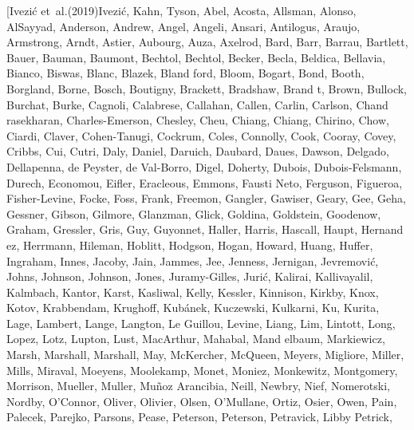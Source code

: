 \documentclass[twocolumn]{aastex62}
\begin{document}
\begin{thebibliography}{}
\bibitem[{{Ivezi{\'c}} {et~al.}(2019){Ivezi{\'c}}, {Kahn}, {Tyson}, {Abel},
  {Acosta}, {Allsman}, {Alonso}, {AlSayyad}, {Anderson}, {Andrew}, {Angel},
  {Angeli}, {Ansari}, {Antilogus}, {Araujo}, {Armstrong}, {Arndt}, {Astier},
  {Aubourg}, {Auza}, {Axelrod}, {Bard}, {Barr}, {Barrau}, {Bartlett}, {Bauer},
  {Bauman}, {Baumont}, {Bechtol}, {Bechtol}, {Becker}, {Becla}, {Beldica},
  {Bellavia}, {Bianco}, {Biswas}, {Blanc}, {Blazek}, {Bland ford}, {Bloom},
  {Bogart}, {Bond}, {Booth}, {Borgland}, {Borne}, {Bosch}, {Boutigny},
  {Brackett}, {Bradshaw}, {Brand t}, {Brown}, {Bullock}, {Burchat}, {Burke},
  {Cagnoli}, {Calabrese}, {Callahan}, {Callen}, {Carlin}, {Carlson}, {Chand
  rasekharan}, {Charles-Emerson}, {Chesley}, {Cheu}, {Chiang}, {Chiang},
  {Chirino}, {Chow}, {Ciardi}, {Claver}, {Cohen-Tanugi}, {Cockrum}, {Coles},
  {Connolly}, {Cook}, {Cooray}, {Covey}, {Cribbs}, {Cui}, {Cutri}, {Daly},
  {Daniel}, {Daruich}, {Daubard}, {Daues}, {Dawson}, {Delgado}, {Dellapenna},
  {de Peyster}, {de Val-Borro}, {Digel}, {Doherty}, {Dubois},
  {Dubois-Felsmann}, {Durech}, {Economou}, {Eifler}, {Eracleous}, {Emmons},
  {Fausti Neto}, {Ferguson}, {Figueroa}, {Fisher-Levine}, {Focke}, {Foss},
  {Frank}, {Freemon}, {Gangler}, {Gawiser}, {Geary}, {Gee}, {Geha}, {Gessner},
  {Gibson}, {Gilmore}, {Glanzman}, {Glick}, {Goldina}, {Goldstein}, {Goodenow},
  {Graham}, {Gressler}, {Gris}, {Guy}, {Guyonnet}, {Haller}, {Harris},
  {Hascall}, {Haupt}, {Hernand ez}, {Herrmann}, {Hileman}, {Hoblitt},
  {Hodgson}, {Hogan}, {Howard}, {Huang}, {Huffer}, {Ingraham}, {Innes},
  {Jacoby}, {Jain}, {Jammes}, {Jee}, {Jenness}, {Jernigan}, {Jevremovi{\'c}},
  {Johns}, {Johnson}, {Johnson}, {Jones}, {Juramy-Gilles}, {Juri{\'c}},
  {Kalirai}, {Kallivayalil}, {Kalmbach}, {Kantor}, {Karst}, {Kasliwal},
  {Kelly}, {Kessler}, {Kinnison}, {Kirkby}, {Knox}, {Kotov}, {Krabbendam},
  {Krughoff}, {Kub{\'a}nek}, {Kuczewski}, {Kulkarni}, {Ku}, {Kurita}, {Lage},
  {Lambert}, {Lange}, {Langton}, {Le Guillou}, {Levine}, {Liang}, {Lim},
  {Lintott}, {Long}, {Lopez}, {Lotz}, {Lupton}, {Lust}, {MacArthur}, {Mahabal},
  {Mand elbaum}, {Markiewicz}, {Marsh}, {Marshall}, {Marshall}, {May},
  {McKercher}, {McQueen}, {Meyers}, {Migliore}, {Miller}, {Mills}, {Miraval},
  {Moeyens}, {Moolekamp}, {Monet}, {Moniez}, {Monkewitz}, {Montgomery},
  {Morrison}, {Mueller}, {Muller}, {Mu{\~n}oz Arancibia}, {Neill}, {Newbry},
  {Nief}, {Nomerotski}, {Nordby}, {O'Connor}, {Oliver}, {Olivier}, {Olsen},
  {O'Mullane}, {Ortiz}, {Osier}, {Owen}, {Pain}, {Palecek}, {Parejko},
  {Parsons}, {Pease}, {Peterson}, {Peterson}, {Petravick}, {Libby Petrick},
}
\end{thebibliography}
\end{document}
